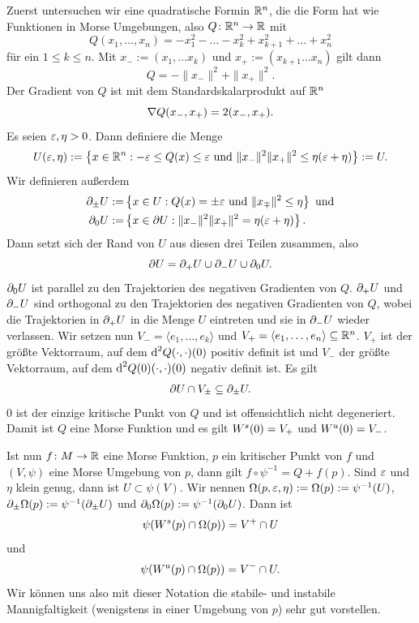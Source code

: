 \begin{definition}
    \label{def: notation morse umgebung}
    Zuerst untersuchen wir eine quadratische Formin ${ \mathbb R }^n$, die die Form hat wie Funktionen in Morse
    Umgebungen, also $Q \colon { \mathbb R }^n \to { \mathbb R }$ mit
    \[ Q(x_1, \dots, x_n) = - x_1^2 - \dots - x_k^2 + x_{k + 1}^2 + \dots + x_n^2 \]
    für ein $1 \leq k \leq n$.
    Mit $x_- := (x_1, \dots x_k)$ und $x_+ := (x_{k + 1} \dots x_n)$ gilt dann
    \[ Q = - \| x_- \|^2 + \| x_+ \|^2 . \]
    Der Gradient von $Q$ ist mit dem Standardskalarprodukt auf ${ \mathbb R }^n$
    \[ { \nabla } Q (x_-, x_+) = 2(x_-, x_+) . \]
    Es seien $\varepsilon, \eta > 0$. Dann definiere die Menge
    \[ U(\varepsilon, \eta) := \left\{ x \in { \mathbb R }^n : - \varepsilon \leq Q(x) \leq \varepsilon 
    \text{ und } \| x_- \|^2 \| x_+ \|^2 \leq \eta(\varepsilon + \eta) \right\} := U . \]
    Wir definieren außerdem
    \begin{align*}
        { \partial }_{\pm} U := & \left\{ x \in U: Q(x) = \pm \varepsilon \text{ und } \|x_{\mp} \|^2 \leq \eta \right\} 
            \text{ und} \\
        { \partial }_0 U := & \left\{ x \in { \partial } U: \| x_- \|^2 \| x_+ \|^2 = \eta(\varepsilon + \eta) \right\} .
    \end{align*}
    Dann setzt sich der Rand von $U$ aus diesen drei Teilen zusammen, also
    \[ { \partial } U = { \partial }_+ U \cup { \partial }_- U \cup { \partial }_0 U . \]
    ${ \partial }_0 U$ ist parallel zu den Trajektorien des negativen Gradienten von $Q$. ${ \partial }_+ U$ und 
    ${ \partial }_- U$ sind orthogonal zu den Trajektorien des negativen Gradienten von $Q$, wobei die 
    Trajektorien in ${ \partial }_+ U$ in die Menge $U$ eintreten und sie in ${ \partial }_- U$ wieder verlassen. 
    Wir setzen nun $V_- = \langle e_1, \dots, e_k \rangle$ und 
    $V_+ = \langle e_1, \dots, e_n \rangle \subseteq { \mathbb R }^n$. $V_+$ ist der größte Vektorraum, 
    auf dem ${ \operatorname{d} }^2 Q (\cdot, \cdot) (0)$ positiv definit ist und $V_-$ der größte Vektorraum, auf dem 
    ${ \operatorname{d} }^2 Q (0) (\cdot, \cdot) (0)$ negativ definit ist. 
    Es gilt 
    \[ { \partial } U \cap V_{\pm} \subseteq { \partial }_{\pm} U . \]
    $0$ ist der einzige kritische Punkt von $Q$ und ist offensichtlich nicht degeneriert. Damit ist $Q$
    eine Morse Funktion und es gilt 
    ${ W^s } (0) = V_+$ und ${ W^u } (0) = V_-$.

    Ist nun $f \colon M \to { \mathbb R }$ eine Morse Funktion, $p$ ein kritischer Punkt von $f$ und $(V, \psi)$
    eine Morse Umgebung von $p$, dann gilt $f \circ \psi^{-1} = Q + f(p)$. Sind $\varepsilon$ und $\eta$
    klein genug, dann ist $U \subset \psi(V)$. Wir nennen 
    $\Omega (p, \varepsilon, \eta) := \Omega (p) := \psi^{-1}(U)$, 
    ${ \partial }_{\pm} \Omega (p) := \psi^{-1}({ \partial }_{\pm}U)$ und ${ \partial }_0 \Omega (p) := \psi^{-1} ({ \partial }_0 U)$.
    Dann ist 
    \[ \psi({ W^s } (p) \cap \Omega (p)) = V^+ \cap U \] 
    und 
    \[ \psi({ W^u } (p) \cap \Omega (p)) = V^- \cap U . \]
    Wir können uns also mit dieser Notation die stabile- und instabile Mannigfaltigkeit (wenigstens 
    in einer Umgebung von $p$) sehr gut vorstellen.


\end{definition}
